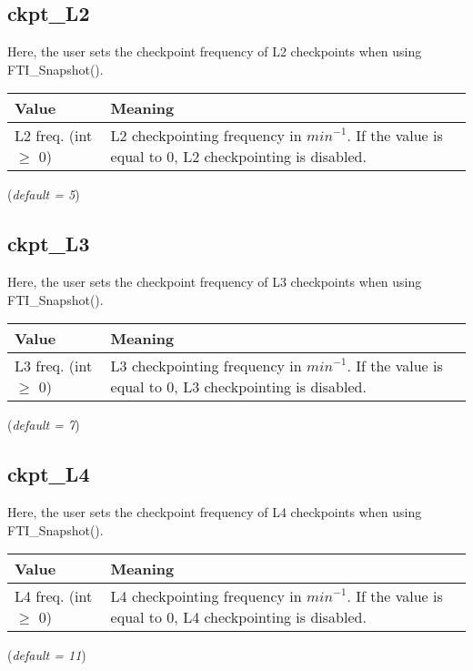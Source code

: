 \documentclass{refrep}
\begin{document}
\subsection{ckpt\_L2}\label{subsec:ckptl2}
Here, the user sets the checkpoint frequency of L2 checkpoints when using FTI\_Snapshot().
\begin{center}
\begin{tabular}[h!]{|p{}|p{}|}
\hline
\textbf{Value} & \textbf{Meaning} \\ \hline
L2 freq. (int $\geq$ 0)  & L2 checkpointing frequency in $\textit{min}^{-1}$. If the value is equal to 0, L2 checkpointing is disabled.  \\ \hline
\end{tabular}
\end{center}
(\textit{default = 5})
\subsection{ckpt\_L3}\label{subsec:ckptl3}
Here, the user sets the checkpoint frequency of L3 checkpoints when using FTI\_Snapshot().
\begin{center}
\begin{tabular}[h!]{|p{}|p{}|}
\hline
\textbf{Value} & \textbf{Meaning} \\ \hline
L3 freq. (int $\geq$ 0)  & L3 checkpointing frequency in $\textit{min}^{-1}$. If the value is equal to 0, L3 checkpointing is disabled.  \\ \hline
\end{tabular}
\end{center}
(\textit{default = 7})
\subsection{ckpt\_L4}\label{subsec:ckptl4}
Here, the user sets the checkpoint frequency of L4 checkpoints when using FTI\_Snapshot().
\begin{center}
\begin{tabular}[h!]{|p{}|p{}|}
\hline
\textbf{Value} & \textbf{Meaning} \\ \hline
L4 freq. (int $\geq$ 0)  & L4 checkpointing frequency in $\textit{min}^{-1}$. If the value is equal to 0, L4 checkpointing is disabled.  \\ \hline
\end{tabular}
\end{center}
(\textit{default = 11})
\end{document}
